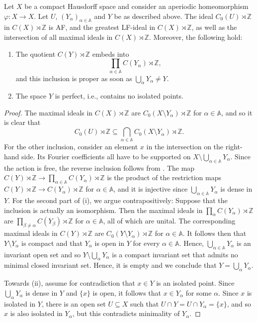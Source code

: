 \documentclass[12pt, a4paper, oneside]{amsart}
\newcommand{\0}{\mathbf{0}}
\newcommand{\1}{\mathbf{1}}
\newcommand{\Z}{\mathbb{Z}}   %
\newcommand{\bbA}{\mathbb{A}}   %
\begin{document}
	\begin{theorem}
		\label{thm_maxAF}
		Let \(X\) be a compact Hausdorff space and consider an aperiodic homeomorphism \(\varphi \colon X \to X\). Let \(U\), \((Y_\alpha)_{\alpha \in \bbA}\) and \(Y\) be as described above. The ideal \(C_0(U) \rtimes \Z\) in \(C(X) \rtimes \Z\) is AF, and the greatest LF-ideal in \(C(X) \rtimes \Z\), as well as the intersection of all maximal ideals in \(C(X) \rtimes \Z\). Moreover, the following hold: 
		\begin{enumerate} 
			\item The quotient \(C(Y) \rtimes \Z\) embeds into \[\prod_{\alpha \in \bbA} C(Y_\alpha) \rtimes \Z,\] and this inclusion is proper as soon as \(\bigcup_\alpha Y_\alpha \neq Y\). 
			\item The space \(Y\) is perfect, i.e., contains no isolated points. 
		\end{enumerate}
	\end{theorem}
	
	\begin{proof}
		The maximal ideals in \(C(X) \rtimes \Z\) are \(C_0(X \setminus Y_\alpha) \rtimes \Z\) for \(\alpha \in \bbA\), and so it is clear that \[C_0(U) \rtimes \Z \subseteq \bigcap_{ \alpha \in \bbA} C_0(X \setminus Y_\alpha) \rtimes \Z.\] For the other inclusion, consider an element \(x\) in the intersection on the right-hand side. Its Fourier coefficients all have to be supported on \(X \setminus \bigcup_{\alpha \in \bbA} Y_\alpha\). Since the action is free, the reverse inclusion follows from \cite{sierakowski}. The map \(C(Y) \rtimes \Z \to \prod_{\alpha \in \bbA} C(Y_\alpha) \rtimes \Z\) is the product of the restriction maps \(C(Y) \rtimes \Z \to C(Y_\alpha) \rtimes \Z\) for \(\alpha \in \bbA\), and it is injective since \(\bigcup_{\alpha \in \bbA} Y_\alpha\) is dense in \(Y\). For the second part of (i), we argue contrapositively: Suppose that the inclusion is actually an isomorphism. Then the maximal ideals in \(\prod_{\alpha} C(Y_\alpha) \rtimes \Z\) are \(\prod_{\beta \neq \alpha} C(Y_\beta) \rtimes \Z\) for \(\alpha \in \bbA\), all of which are unital. The corresponding maximal ideals in \(C(Y) \rtimes \Z\) are \(C_0(Y \setminus Y_\alpha) \rtimes \Z\) for \(\alpha \in \bbA\). It follows then that \(Y \setminus Y_\alpha\) is compact and that \(Y_\alpha\) is open in \(Y\) for every \(\alpha \in \bbA\). Hence, \(\bigcup_{\alpha \in \bbA} Y_\alpha\) is an invariant open set and so \(Y \setminus \bigcup_\alpha Y_\alpha\) is a compact invariant set that admits no minimal closed invariant set. Hence, it is empty and we conclude that \(Y = \bigcup_\alpha Y_\alpha\). 
		
		Towards (ii), assume for contradiction that \(x \in Y\) is an isolated point. Since \(\bigcup_\alpha Y_\alpha\) is dense in \(Y\) and \(\{x\}\) is open, it follows that \(x \in Y_\alpha\) for some \(\alpha\). Since \(x\) is isolated in \(Y\), there is an open set \(U \subseteq X\) such that \(U \cap Y = U \cap Y_\alpha = \{x\}\), and so \(x\) is also isolated in \(Y_\alpha\), but this contradicts minimality of \(Y_\alpha\). 
	\end{proof}
	
\end{document}
